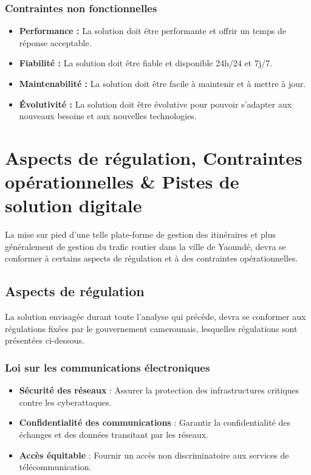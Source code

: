 \documentclass{article}
\begin{document}
\subsubsection*{Contraintes non fonctionnelles}
\begin{itemize}
    \item \textbf{Performance :} La solution doit être performante et offrir un temps de réponse acceptable.
    \item \textbf{Fiabilité :} La solution doit être fiable et disponible 24h/24 et 7j/7.
    \item \textbf{Maintenabilité :} La solution doit être facile à maintenir et à mettre à jour.
    \item \textbf{Évolutivité :} La solution doit être évolutive pour pouvoir s'adapter aux nouveaux besoins et aux nouvelles technologies.
\end{itemize}

 \section{Aspects de régulation, Contraintes opérationnelles \& Pistes de solution digitale}

La mise sur pied d'une telle plate-forme de gestion des itinéraires et plus généralement de gestion du trafic routier dans la ville de Yaoundé, devra se conformer à certains aspects de régulation et à des contraintes opérationnelles.

\subsection{Aspects de régulation}

La solution envisagée durant toute l'analyse qui précède, devra se conformer aux régulations fixées par le gouvernement camerounais, lesquelles régulations sont présentées ci-dessous.

\subsubsection*{Loi sur les communications électroniques}

\begin{itemize}
  \item \textbf{Sécurité des réseaux} : Assurer la protection des infrastructures critiques contre les cyberattaques.
  \item \textbf{Confidentialité des communications} : Garantir la confidentialité des échanges et des données transitant par les réseaux.
  \item \textbf{Accès équitable} : Fournir un accès non discriminatoire aux services de télécommunication.
\end{itemize}
\end{document}
